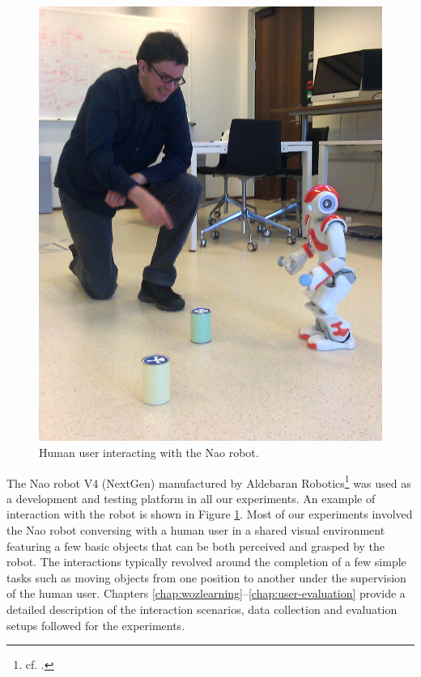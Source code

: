 \begin{figure}
\vspace{-6mm}
\centering 
\includegraphics[scale=0.1]{imgs/nao1.jpg}
\caption{Human user interacting with the Nao robot.}
\label{fig:nao}
\end{figure}

The Nao robot V4 (NextGen)  manufactured by Aldebaran Robotics\footnote{cf.  .} was used as a development and testing platform in all our experiments. An example of interaction with the robot is shown in Figure \ref{fig:nao}.  Most of our experiments involved the Nao robot conversing with a human user in a shared visual environment featuring a few basic objects that can be both perceived and grasped by the robot.  The interactions typically revolved around the completion of a few simple tasks such as moving objects from one position to another under the supervision of the human user. Chapters \ref{chap:wozlearning}--\ref{chap:user-evaluation} provide a detailed description of the interaction scenarios, data collection and evaluation setups followed for the experiments.

